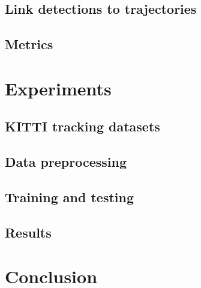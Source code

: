\documentclass{bmvc2k}
\begin{document}
\subsection{Link detections to trajectories}

\subsection{Metrics}

\section{Experiments}
\label{sec:experiments}

\subsection{KITTI tracking datasets}


\subsection{Data preprocessing}


\subsection{Training and testing}

\subsection{Results}

\section{Conclusion}
\label{sec:conclusion}



\end{document}

